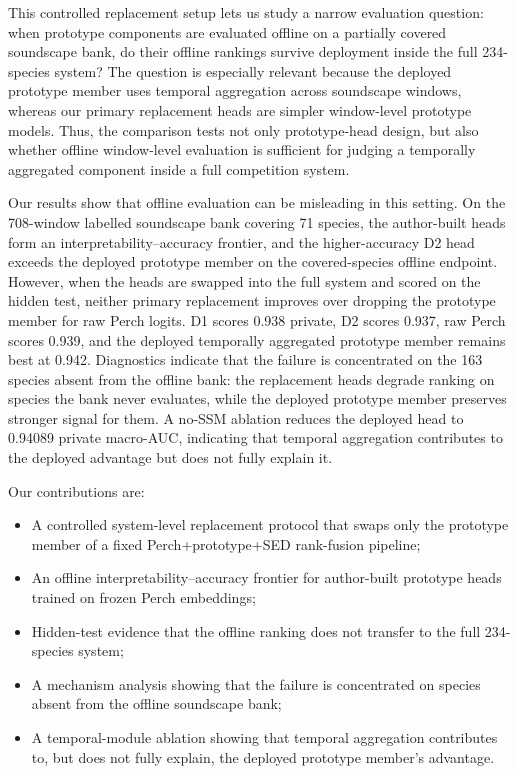 \documentclass{ceurart}
\begin{document}
This controlled replacement setup lets us study a narrow evaluation question: when prototype components are evaluated offline on a partially covered soundscape bank, do their offline rankings survive deployment inside the full 234-species system? The question is especially relevant because the deployed prototype member uses temporal aggregation across soundscape windows, whereas our primary replacement heads are simpler window-level prototype models. Thus, the comparison tests not only prototype-head design, but also whether offline window-level evaluation is sufficient for judging a temporally aggregated component inside a full competition system.

Our results show that offline evaluation can be misleading in this setting. On the 708-window labelled soundscape bank covering 71 species, the author-built heads form an interpretability--accuracy frontier, and the higher-accuracy D2 head exceeds the deployed prototype member on the covered-species offline endpoint. However, when the heads are swapped into the full system and scored on the hidden test, neither primary replacement improves over dropping the prototype member for raw Perch logits. D1 scores 0.938 private, D2 scores 0.937, raw Perch scores 0.939, and the deployed temporally aggregated prototype member remains best at 0.942. Diagnostics indicate that the failure is concentrated on the 163 species absent from the offline bank: the replacement heads degrade ranking on species the bank never evaluates, while the deployed prototype member preserves stronger signal for them. A no-SSM ablation reduces the deployed head to 0.94089 private macro-AUC, indicating that temporal aggregation contributes to the deployed advantage but does not fully explain it.

Our contributions are:

\begin{itemize}
\item A controlled system-level replacement protocol that swaps only the prototype member of a fixed Perch+prototype+SED rank-fusion pipeline;
\item An offline interpretability--accuracy frontier for author-built prototype heads trained on frozen Perch embeddings;
\item Hidden-test evidence that the offline ranking does not transfer to the full 234-species system;
\item A mechanism analysis showing that the failure is concentrated on species absent from the offline soundscape bank;
\item A temporal-module ablation showing that temporal aggregation contributes to, but does not fully explain, the deployed prototype member's advantage.
\end{itemize}
\end{document}
